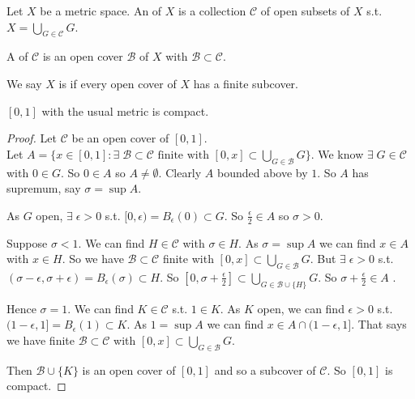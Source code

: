 \begin{definition}
    Let $X$ be a metric space.
    An  of $X$ is a collection $\mathcal{C}$ of open subsets of $X$ s.t. $X = \bigcup_{G \in \mathcal{C}} G$.
\end{definition} 

\begin{definition}[Subcover]
    A  of $\mathcal{C}$ is an open cover $\mathcal{B}$ of $X$ with $\mathcal{B} \subset \mathcal{C}$.
\end{definition} 

\begin{definition}[Compact]
    We say $X$ is  if every open cover of $X$ has a finite subcover.
\end{definition} 

\begin{example}
    $[0, 1]$ with the usual metric is compact.
\end{example} 

\begin{proof}
    Let $\mathcal{C}$ be an open cover of $[0, 1]$. \\
    Let $A = \{ x \in [0, 1] : \exists \; \mathcal{B} \subset \mathcal{C} \text{ finite with } [0, x] \subset \bigcup_{G \in \mathcal{B}} G \}$.
    We know $\exists \; G \in \mathcal{C}$ with $0 \in G$.
    So $0 \in A$ so $A \neq \emptyset$.
    Clearly $A$ bounded above by $1$.
    So $A$ has supremum, say $\sigma = \sup A$.

    As $G$ open, $\exists \; \epsilon > 0$ s.t. $[0, \epsilon) = B_\epsilon(0) \subset G$.
    So $\frac{\epsilon}{2} \in A$ so $\sigma > 0$.

    Suppose $\sigma < 1$.
    We can find $H \in \mathcal{C}$ with $\sigma \in H$.
    As $\sigma = \sup A$ we can find $x \in A$ with $x \in H$.
    So we have $\mathcal{B} \subset \mathcal{C}$ finite with $[0, x] \subset \bigcup_{G \in \mathcal{B}} G$.
    But $\exists \; \epsilon > 0$ s.t. $(\sigma - \epsilon, \sigma + \epsilon) = B_\epsilon(\sigma) \subset H$.
    So $[0, \sigma + \frac{\epsilon}{2}] \subset \bigcup_{G \in \mathcal{B} \cup \{H\}} G$.
    So $\sigma + \frac{\epsilon}{2} \in A$ \Lightning.

    Hence $\sigma = 1$.
    We can find $K \in \mathcal{C}$ s.t. $1 \in K$.
    As $K$ open, we can find $\epsilon > 0$ s.t. $(1 - \epsilon, 1] = B_\epsilon(1) \subset K$.
    As $1 = \sup A$ we can find $x \in A \cap (1 - \epsilon, 1]$.
    That says we have finite $\mathcal{B} \subset \mathcal{C}$ with $[0, x] \subset \bigcup_{G \in \mathcal{B}} G$.

    Then $\mathcal{B} \cup \{K\}$ is an open cover of $[0, 1]$ and so a subcover of $\mathcal{C}$.
    So $[0, 1]$ is compact.
\end{proof} 